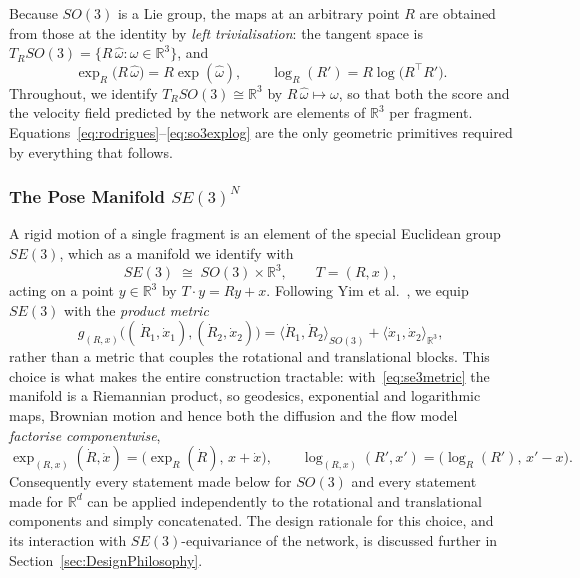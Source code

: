 \documentclass[a4paper,12pt]{article}
\theoremstyle{remark}
\begin{document}
Because $SO(3)$ is a Lie group, the maps at an arbitrary point $R$ are obtained from
those at the identity by \emph{left trivialisation}: the tangent space is
$T_RSO(3)=\{R\,\widehat\omega:\omega\in\mathbb R^3\}$, and
\begin{equation}
\label{eq:so3explog}
\exp_R\bigl(R\,\widehat\omega\bigr)
=
R\exp(\widehat\omega),
\qquad
\log_R(R')
=
R\log\!\bigl(R^\top R'\bigr).
\end{equation}
Throughout, we identify $T_RSO(3)\cong\mathbb R^3$ by
$R\,\widehat\omega\mapsto\omega$, so that both the score and the velocity field
predicted by the network are elements of $\mathbb R^3$ per fragment.
Equations~\eqref{eq:rodrigues}--\eqref{eq:so3explog} are the only geometric primitives
required by everything that follows.

\subsubsection{The Pose Manifold $SE(3)^N$}
\label{sec:se3}

A rigid motion of a single fragment is an element of the special Euclidean group
$SE(3)$, which as a manifold we identify with
\[
SE(3)\;\cong\;SO(3)\times\mathbb R^3,
\qquad
T=(R,x),
\]
acting on a point $y\in\mathbb R^3$ by $T\cdot y=Ry+x$. Following Yim et
al.~\cite{bortoliRiemannianScoreBasedGenerative2022}, we equip $SE(3)$ with the \emph{product metric}
\begin{equation}
\label{eq:se3metric}
g_{(R,x)}\bigl((\,\dot R_1,\dot x_1),(\dot R_2,\dot x_2)\bigr)
=
\langle \dot R_1,\dot R_2\rangle_{SO(3)}
+
\langle \dot x_1,\dot x_2\rangle_{\mathbb R^3},
\end{equation}
rather than a metric that couples the rotational and translational blocks. This choice
is what makes the entire construction tractable: with~\eqref{eq:se3metric} the manifold
is a Riemannian product, so geodesics, exponential and logarithmic maps, Brownian
motion and hence both the diffusion and the flow model \emph{factorise componentwise},
\[
\exp_{(R,x)}(\dot R,\dot x)
=
\bigl(\exp_R(\dot R),\,x+\dot x\bigr),
\qquad
\log_{(R,x)}(R',x')
=
\bigl(\log_R(R'),\,x'-x\bigr).
\]
Consequently every statement made below for $SO(3)$ and every statement made for
$\mathbb R^d$ can be applied independently to the rotational and translational
components and simply concatenated. The design rationale for this choice, and its
interaction with $SE(3)$-equivariance of the network, is discussed further in
Section~\ref{sec:DesignPhilosophy}.
\end{document}
